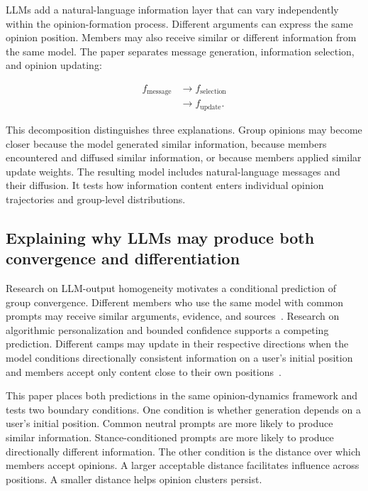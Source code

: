 \documentclass[11pt,a4paper]{article}
\begin{document}
LLMs add a natural-language information layer that can vary independently within the opinion-formation process. Different arguments can express the same opinion position. Members may also receive similar or different information from the same model. The paper separates message generation, information selection, and opinion updating:

\begin{equation*}
\begin{aligned}f_{\text{message}} &\rightarrow f_{\text{selection}} \\
&\rightarrow f_{\text{update}}.\end{aligned}
\end{equation*}

This decomposition distinguishes three explanations. Group opinions may become closer because the model generated similar information, because members encountered and diffused similar information, or because members applied similar update weights. The resulting model includes natural-language messages and their diffusion. It tests how information content enters individual opinion trajectories and group-level distributions.

\subsection{Explaining why LLMs may produce both convergence and differentiation}

Research on LLM-output homogeneity motivates a conditional prediction of group convergence. Different members who use the same model with common prompts may receive similar arguments, evidence, and sources~\citep{jiang2025}. Research on algorithmic personalization and bounded confidence supports a competing prediction. Different camps may update in their respective directions when the model conditions directionally consistent information on a user's initial position and members accept only content close to their own positions~\citep{perra2019,hegselmann2002}.

This paper places both predictions in the same opinion-dynamics framework and tests two boundary conditions. One condition is whether generation depends on a user's initial position. Common neutral prompts are more likely to produce similar information. Stance-conditioned prompts are more likely to produce directionally different information. The other condition is the distance over which members accept opinions. A larger acceptable distance facilitates influence across positions. A smaller distance helps opinion clusters persist.
\end{document}
